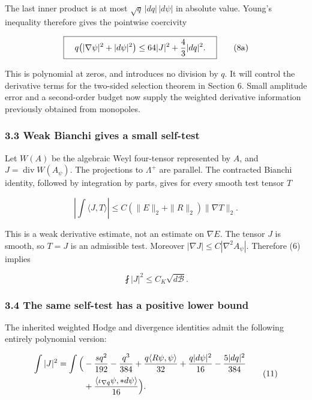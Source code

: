 \documentclass[
  10pt,
]{article}
\begin{document}
The last inner product is at most \(\sqrt q\,|dq|\,|d\psi|\) in absolute
value. Young's inequality therefore gives the pointwise coercivity

\[
 \boxed{\quad
 q\bigl(|\nabla\psi|^2+|d\psi|^2\bigr)
        \le64|J|^2+{4\over3}|dq|^2.
 \quad}                                                     \tag{8a}
\]

This is polynomial at zeros, and introduces no division by \(q\). It
will control the derivative terms for the two-sided selection theorem in
Section 6. Small amplitude error and a second-order budget now supply
the weighted derivative information previously obtained from monopoles.

\hypertarget{weak-bianchi-gives-a-small-self-test}{%
\subsubsection{3.3 Weak Bianchi gives a small
self-test}\label{weak-bianchi-gives-a-small-self-test}}

Let \(W(A)\) be the algebraic Weyl four-tensor represented by \(A\), and
\(J=\operatorname{div}W(A_\psi)\). The projections to \(\Lambda^+\) are
parallel. The contracted Bianchi identity, followed by integration by
parts, gives for every smooth test tensor \(T\)

\[
 \left|\int\langle J,T\rangle\right|
 \le C\left(\|E\|_2+\|R\|_2\right)\|\nabla T\|_2.      \tag{9}
\]

This is a weak derivative estimate, not an estimate on \(\nabla E\). The
tensor \(J\) is smooth, so \(T=J\) is an admissible test. Moreover
\(|\nabla J|\le C|\nabla^2A_\psi|\). Therefore (6) implies

\[
                 \fint|J|^2\le C_K\sqrt{d\mathcal B}.    \tag{10}
\]

\hypertarget{the-same-self-test-has-a-positive-lower-bound}{%
\subsubsection{3.4 The same self-test has a positive lower
bound}\label{the-same-self-test-has-a-positive-lower-bound}}

The inherited weighted Hodge and divergence identities admit the
following entirely polynomial version:

\[
\begin{aligned}
 \int|J|^2=\int\Big(&-{s q^2\over192}-{q^3\over384}
       +{q\langle R\psi,\psi\rangle\over32}
       +{q|d\psi|^2\over16}-{5|dq|^2\over384}\\
       &+{\langle\iota_{\nabla q}\psi,*d\psi\rangle\over16}
                           \Big).                         
\end{aligned}\tag{11}
\]
\end{document}
